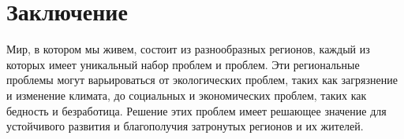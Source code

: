 \chapter*{Заключение}



Мир, в котором мы живем, состоит из разнообразных регионов, каждый из которых имеет уникальный набор проблем и проблем. Эти региональные проблемы могут варьироваться от экологических проблем, таких как загрязнение и изменение климата, до социальных и экономических проблем, таких как бедность и безработица. Решение этих проблем имеет решающее значение для устойчивого развития и благополучия затронутых регионов и их жителей.